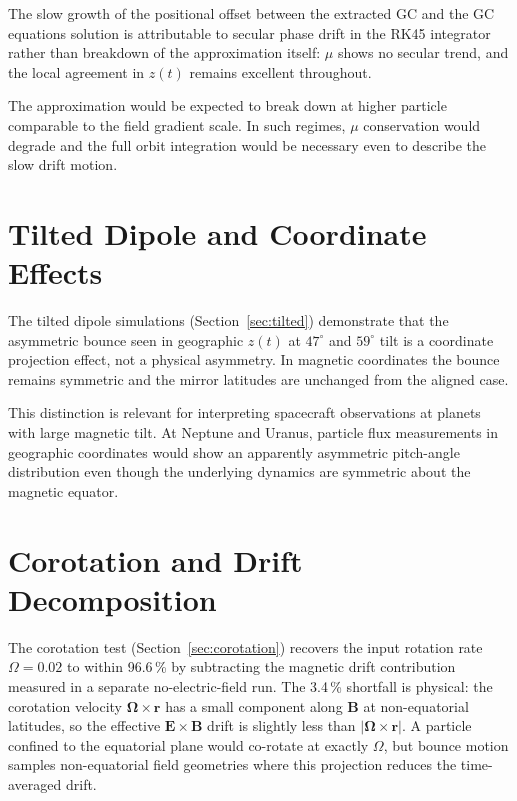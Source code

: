 The slow growth of the positional offset between the extracted GC and the GC equations solution is attributable to secular phase drift in the RK45 integrator rather than breakdown of the approximation itself: $\mu$ shows no secular trend, and the local agreement in $z(t)$ remains excellent throughout.

The approximation would be expected to break down at higher particle comparable to the field gradient scale. In such regimes, $\mu$ conservation would degrade and the full orbit integration would be necessary even to describe the slow drift motion.

\section{Tilted Dipole and Coordinate Effects}
\label{sec:disc_tilted}

The tilted dipole simulations (Section~\ref{sec:tilted}) demonstrate that the asymmetric bounce seen in geographic $z(t)$ at $47^\circ$ and $59^\circ$ tilt is a coordinate projection effect, not a physical asymmetry. In magnetic coordinates the bounce remains symmetric and the mirror latitudes are unchanged from the aligned case.

This distinction is relevant for interpreting spacecraft observations at planets with large magnetic tilt. At Neptune and Uranus, particle flux measurements in geographic coordinates would show an apparently asymmetric pitch-angle distribution even though the underlying dynamics are symmetric about the magnetic equator.

\section{Corotation and Drift Decomposition}
\label{sec:disc_corotation}

The corotation test (Section~\ref{sec:corotation}) recovers the input rotation rate $\Omega = 0.02$ to within 96.6\,\% by subtracting the magnetic drift contribution measured in a separate no-electric-field run. The 3.4\,\% shortfall is physical: the corotation velocity $\boldsymbol{\Omega} \times \mathbf{r}$ has a small component along $\mathbf{B}$ at non-equatorial latitudes, so the effective $\mathbf{E} \times \mathbf{B}$ drift is slightly less than $|\boldsymbol{\Omega} \times \mathbf{r}|$. A particle confined to the equatorial plane would co-rotate at exactly $\Omega$, but bounce motion
samples non-equatorial field geometries where this projection reduces the time-averaged drift.

